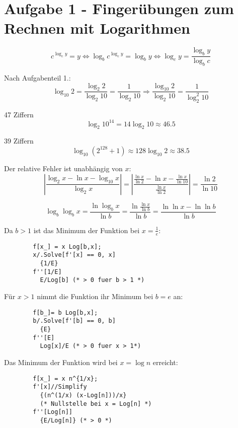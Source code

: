 \section*{Aufgabe 1 - Fingerübungen zum Rechnen mit Logarithmen}

\begin{flushenum}
\item
	\[ c^{\log_c y} = y \Leftrightarrow 
	\log_b c^{\log_c y} = \log_b y \Leftrightarrow \log_c y =
	\frac{\log_b y}{\log_b c}\]
\item Nach Aufgabenteil 1.:
	\[ \log_{10} 2 = \frac{\log_2 2}{\log_2 10} = \frac{1}{\log_2 10}
	\Rightarrow \frac{\log_{10} 2}{\log_2 10} = \frac{1}{\log_2^2 10} \]

\item 47 Ziffern \[ \log_2 10^{14} = 14 \log_2 10 \approx 46.5 \]

\item 39 Ziffern \[ \log_{10} (2^{128} + 1) \approx 128 \log_{10} 2 \approx 38.5 \]

\item Der relative Fehler ist unabhängig von $x$:
	\[ \left| \frac{\log_2 x - \ln x - \log_{10} x}{\log_2 x} \right| =
	\left| \frac{\frac{\ln x}{\ln 2} - \ln x - \frac{\ln x}{\ln
	10}}{\frac{\ln x}{\ln 2}} \right| = \frac{\ln 2}{\ln 10} \]

\item
	\[ \log_b \log_b x = \frac{\ln \log_b x}{\ln b} = \frac{\ln \frac{\ln
	x}{\ln b}}{\ln b} = \frac{\ln \ln x - \ln \ln b}{\ln b}\]

\item Da $b > 1$ ist das Minimum der Funktion bei $x = \frac{1}{e}$:
	\lstset{language=Mathematice}
	\begin{lstlisting}
		f[x_] = x Log[b,x];
		x/.Solve[f'[x] == 0, x]
		  {1/E}
		f''[1/E]
		  E/Log[b] (* > 0 fuer b > 1 *)
	\end{lstlisting}

\item Für $x > 1$ nimmt die Funktion ihr Minimum bei $b = e$ an:
	\begin{lstlisting}
		f[b_]= b Log[b,x];
		b/.Solve[f'[b] == 0, b]
		  {E}
		f''[E]
		  Log[x]/E (* > 0 fuer x > 1*)
	\end{lstlisting}

\item Das Minimum der Funktion wird bei $x = \log n$ erreicht:
	\begin{lstlisting}
		f[x_] = x n^{1/x};
		f'[x]//Simplify
		  {(n^(1/x) (x-Log[n]))/x}
		  (* Nullstelle bei x = Log[n] *)
		f''[Log[n]]
		  {E/Log[n]} (* > 0 *)
	\end{lstlisting}


\end{flushenum}
